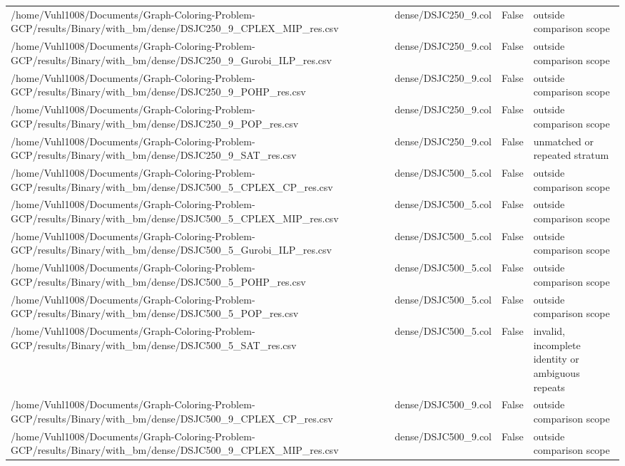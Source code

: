 \begin{table}[htbp]
\begin{tabular}{llll}
/home/Vuhl1008/Documents/Graph-Coloring-Problem-GCP/results/Binary/with\_bm/dense/DSJC250\_9\_CPLEX\_MIP\_res.csv & dense/DSJC250\_9.col & False & outside comparison scope \\
/home/Vuhl1008/Documents/Graph-Coloring-Problem-GCP/results/Binary/with\_bm/dense/DSJC250\_9\_Gurobi\_ILP\_res.csv & dense/DSJC250\_9.col & False & outside comparison scope \\
/home/Vuhl1008/Documents/Graph-Coloring-Problem-GCP/results/Binary/with\_bm/dense/DSJC250\_9\_POHP\_res.csv & dense/DSJC250\_9.col & False & outside comparison scope \\
/home/Vuhl1008/Documents/Graph-Coloring-Problem-GCP/results/Binary/with\_bm/dense/DSJC250\_9\_POP\_res.csv & dense/DSJC250\_9.col & False & outside comparison scope \\
/home/Vuhl1008/Documents/Graph-Coloring-Problem-GCP/results/Binary/with\_bm/dense/DSJC250\_9\_SAT\_res.csv & dense/DSJC250\_9.col & False & unmatched or repeated stratum \\
/home/Vuhl1008/Documents/Graph-Coloring-Problem-GCP/results/Binary/with\_bm/dense/DSJC500\_5\_CPLEX\_CP\_res.csv & dense/DSJC500\_5.col & False & outside comparison scope \\
/home/Vuhl1008/Documents/Graph-Coloring-Problem-GCP/results/Binary/with\_bm/dense/DSJC500\_5\_CPLEX\_MIP\_res.csv & dense/DSJC500\_5.col & False & outside comparison scope \\
/home/Vuhl1008/Documents/Graph-Coloring-Problem-GCP/results/Binary/with\_bm/dense/DSJC500\_5\_Gurobi\_ILP\_res.csv & dense/DSJC500\_5.col & False & outside comparison scope \\
/home/Vuhl1008/Documents/Graph-Coloring-Problem-GCP/results/Binary/with\_bm/dense/DSJC500\_5\_POHP\_res.csv & dense/DSJC500\_5.col & False & outside comparison scope \\
/home/Vuhl1008/Documents/Graph-Coloring-Problem-GCP/results/Binary/with\_bm/dense/DSJC500\_5\_POP\_res.csv & dense/DSJC500\_5.col & False & outside comparison scope \\
/home/Vuhl1008/Documents/Graph-Coloring-Problem-GCP/results/Binary/with\_bm/dense/DSJC500\_5\_SAT\_res.csv & dense/DSJC500\_5.col & False & invalid, incomplete identity or ambiguous repeats \\
/home/Vuhl1008/Documents/Graph-Coloring-Problem-GCP/results/Binary/with\_bm/dense/DSJC500\_9\_CPLEX\_CP\_res.csv & dense/DSJC500\_9.col & False & outside comparison scope \\
/home/Vuhl1008/Documents/Graph-Coloring-Problem-GCP/results/Binary/with\_bm/dense/DSJC500\_9\_CPLEX\_MIP\_res.csv & dense/DSJC500\_9.col & False & outside comparison scope \\

\end{tabular}
\end{table}
